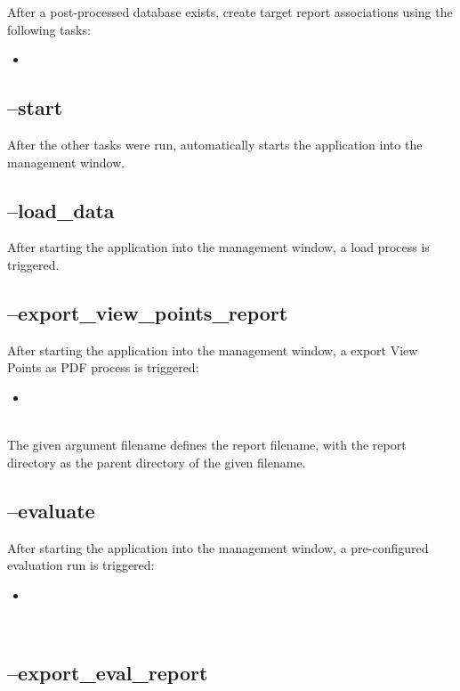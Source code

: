 After a post-processed database exists, create target report associations using the following tasks:

\begin{itemize}
 \item {}
\end{itemize}

\subsection{--start}

After the other tasks were run, automatically starts the application into the management window.

\subsection{--load\_data}

After starting the application into the management window, a load process is triggered.


\subsection{--export\_view\_points\_report}

After starting the application into the management window, a export View Points as PDF process is triggered:

\begin{itemize}
 \item {}
\end{itemize}
\ \\

The given argument filename defines the report filename, with the report directory as the parent directory of the given filename.

\subsection{--evaluate}

After starting the application into the management window, a pre-configured evaluation run is triggered:

\begin{itemize}
 \item {}
\end{itemize}
\ \\

\subsection{--export\_eval\_report}

